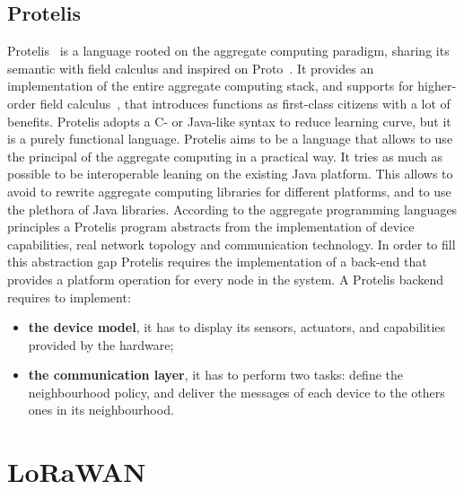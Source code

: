 \subsection{Protelis}
\label{subSec:Protelis}
Protelis~\cite{PianiniSAC2015} is a language rooted on the aggregate computing paradigm, sharing its semantic with field calculus and inspired on Proto~\cite{Proto}. %
It provides an implementation of the entire aggregate computing stack, and supports for higher-order field calculus~\cite{Audrito2019}, that introduces functions as first-class citizens with a lot of benefits.
Protelis adopts a C- or Java-like syntax to reduce learning curve, but it is a purely functional language.
% 
Protelis aims to be a language that allows to use the principal of the aggregate computing in a practical way. 
It tries as much as possible to be interoperable leaning on the existing Java platform.
This allows to avoid to rewrite aggregate computing libraries for different platforms, and to use the plethora of Java libraries.
According to the aggregate programming languages principles a Protelis program abstracts from the implementation of device capabilities, real network topology and communication technology. 
In order to fill this abstraction gap Protelis requires the implementation of a back-end that provides a platform operation for every node in the system. 
A Protelis backend requires to implement:
\begin{itemize}
    \item \textbf{the device model}, it has to display its sensors, actuators, and capabilities provided by the hardware;
    \item \textbf{the communication layer}, it has to perform two tasks: define the neighbourhood policy, and deliver the messages of each device to the others ones in its neighbourhood. 
\end{itemize}

\clearpage
\section{LoRaWAN}
\label{sec:LoRaWAN}

